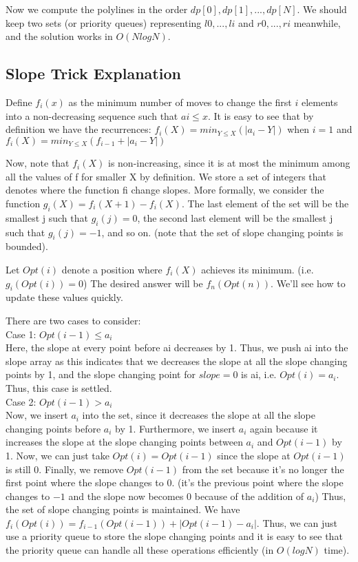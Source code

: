 Now we compute the polylines in the order $dp[0], dp[1], . . . , dp[N]$. We should keep two sets (or priority
queues) representing ${l0,...,li}$ and ${r0,...,ri}$ meanwhile, and the solution works in $O(NlogN)$. 


\subsection{Slope Trick Explanation}
Define $f_{i}(x)$ as the minimum number of moves to change the first $i$ elements into a non-decreasing sequence such that $ai \leq x$.
It is easy to see that by definition we have the recurrences:
$f_{i}(X) = min_{Y \leq X}(|a_{i}-Y|)$ when $i=1$
and
$f_{i}(X) = min_{Y \leq X}(f_{i-1}+|a_{i}-Y|)$

Now, note that $f_{i}(X)$ is non-increasing, since it is at most the minimum among all the values of f for smaller X by definition. We store a set of integers that denotes where the function fi change slopes. More formally, we consider the function $g_{i}(X) = f_{i}(X+1)-f_{i}(X)$. The last element of the set will be the smallest j such that $g_{i}(j)=0$, the second last element will be the smallest j such that $g_{i}(j)=-1$, and so on. 
(note that the set of slope changing points is bounded).

Let $Opt(i)$ denote a position where $f_{i}(X)$ achieves its minimum. (i.e. $g_{i}(Opt(i)) = 0$) The desired answer will be $f_{n}(Opt(n))$. We'll see how to update these values quickly.

There are two cases to consider: \\
Case 1: $Opt(i-1) \leq a_{i}$ \\
Here, the slope at every point before ai decreases by 1. Thus, we push ai into the slope array as this indicates that we decreases the slope at all the slope changing points by 1, 
and the slope changing point for $slope=0$ is ai, i.e. $Opt(i) = a_{i}$. Thus, this case is settled. \\

Case 2: $Opt(i-1) > a_{i}$ \\
Now, we insert $a_{i}$ into the set, since it decreases the slope at all the slope changing points before $a_{i}$ by 1. 
Furthermore, we insert $a_{i}$ again because it increases the slope at the slope changing points between $a_{i}$ and $Opt(i-1)$ by 1.
Now, we can just take $Opt(i) = Opt(i-1)$ since the slope at $Opt(i-1)$ is still 0. Finally, we remove $Opt(i-1)$
from the set because it's no longer the first point where the slope changes to 0. 
(it's the previous point where the slope changes to $-1$ and the slope now becomes 0 because of the addition of $a_{i}$)
Thus, the set of slope changing points is maintained. We have $f_{i}(Opt(i)) = f_{i-1}(Opt(i-1))+|Opt(i-1)-a_{i}|$.
Thus, we can just use a priority queue to store the slope changing points and it is easy to see that the priority queue can handle all these operations efficiently (in $O(log N)$ time).


